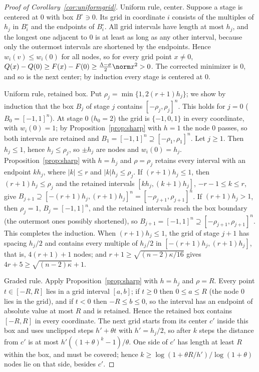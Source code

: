 \begin{proof}[Proof of Corollary~\ref{cor:uniformgrid}]

Uniform rule, center. Suppose a stage is centered at $0$ with box
$B^\circ\ni0$. Its grid in coordinate $i$ consists of the multiples of $h_j$
in $B^\circ_i$ and the endpoints of $B^\circ_i$. All grid intervals have length
at most $h_j$, and the longest one adjacent to $0$ is at least as long as any
other interval, because only the outermost intervals are shortened by the
endpoints. Hence $w_i(v)\le w_i(0)$ for all nodes, so for every grid point
$x\ne0$,
$Q(x)-Q(0)\ge F(x)-F(0)\ge\frac{\Lambda-\sigma}2\norm x^2>0$. The corrected
minimizer is $0$, and so is the next center; by induction every stage is
centered at $0$.

Uniform rule, retained box. Put $\rho_j=\min\{1,2(r+1)h_j\}$; we show by
induction that the box $B_j$ of stage $j$ contains $[-\rho_j,\rho_j]^n$.
This holds for $j=0$ ($B_0=[-1,1]^n$). At stage $0$ ($h_0=2$) the grid is
$\{-1,0,1\}$ in every coordinate, with $w_i(0)=1$; by
Proposition~\ref{prop:sharp} with $h=1$ the node $0$ passes, so both
intervals are retained and $B_1=[-1,1]^n\supseteq[-\rho_1,\rho_1]^n$. Let
$j\ge1$. Then $h_j\le1$, hence $h_j\le\rho_j$, so $\pm h_j$ are nodes and
$w_i(0)=h_j$. Proposition~\ref{prop:sharp} with $h=h_j$ and
$\rho=\rho_j$ retains every interval with an endpoint $kh_j$, where
$|k|\le r$ and $|k|h_j\le\rho_j$. If $(r+1)h_j\le1$, then $(r+1)h_j\le\rho_j$
and the retained intervals $[kh_j,(k+1)h_j]$, $-r-1\le k\le r$, give
$B_{j+1}\supseteq[-(r+1)h_j,(r+1)h_j]^n=[-\rho_{j+1},\rho_{j+1}]^n$. If
$(r+1)h_j>1$, then $\rho_j=1$, $B_j=[-1,1]^n$, and the retained intervals
reach the box boundary (the outermost ones possibly shortened), so
$B_{j+1}=[-1,1]^n\supseteq[-\rho_{j+1},\rho_{j+1}]^n$. This completes the
induction. When $(r+1)h_j\le1$, the grid of stage $j+1$ has spacing $h_j/2$
and contains every multiple of $h_j/2$ in $[-(r+1)h_j,(r+1)h_j]$, that is,
$4(r+1)+1$ nodes; and $r+1\ge\sqrt{(n-2)\kappa/16}$ gives
$4r+5\ge\sqrt{(n-2)\kappa}+1$.

Graded rule. Apply Proposition~\ref{prop:sharp} with $h=h_j$ and
$\rho=R$. Every point $t\in[-R,R]$ lies in a grid interval $[a,b]$; if
$t\ge0$ then $0\le a\le R$ (the node $0$ lies in the grid), and if $t<0$ then
$-R\le b\le0$, so the interval has an endpoint of absolute value at most
$R$ and is retained. Hence the retained box contains $[-R,R]$ in every
coordinate. The next grid starts from its center $c'$ inside this box and
uses unclipped steps $h'+\theta t$ with $h'=h_j/2$, so after $k$ steps the
distance from $c'$ is at most $h'((1+\theta)^k-1)/\theta$. One side of $c'$
has length at least $R$ within the box, and must be covered; hence
$k\ge\log(1+\theta R/h')/\log(1+\theta)$ nodes lie on that side, besides
$c'$.
\end{proof}

